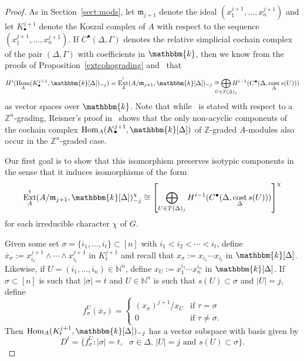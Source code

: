 \documentclass[10pt]{amsart}
\theoremstyle{definition}
\DeclareMathOperator\cost{cost}
\DeclareMathOperator{\Hom}{Hom}
\DeclareMathOperator{\Ext}{Ext}
\newcommand{\field}{\mathbbm{k}}
\newcommand{\NN}{{\mathbb N}}
\newcommand{\ZZ}{{\mathbb Z}}
\newcommand{\mideal}{\ensuremath{\mathfrak{m}}}
\begin{document}
\begin{proof}
As in Section~\ref{sect:mods}, let $\mideal_{j+1}$ denote the ideal $(x_1^{j+1}, \ldots, x_n^{j+1})$ and let $K_\bullet^{j+1}$ denote the Koszul complex of $A$ with respect to the sequence $(x_1^{j+1}, \ldots, x_n^{j+1})$. If $C^\bullet(\Delta, \Gamma)$ denotes the relative simplicial cochain complex of the pair $(\Delta, \Gamma)$ with coefficients in $\field$, then we know from the proofs of Proposition~\ref{extcohograding} and~\cite[Theorem~1]{characterizations} that
\begin{align}\label{ExtAndCochainComplex}
H^i(\Hom_A(K_\bullet^{j+1}, \field[\Delta])_{-j})=\Ext_{A}^i(A/\mideal_{j+1}, \field[\Delta])_{-j}\cong \bigoplus_{\mathclap{{U\in T(\Delta)_j}}}H^{i-1}(C^\bullet(\Delta, \cost_\Delta s(U)))
\end{align}
as vector spaces over $\field$. Note that while~\cite[Theorem~1]{characterizations} is stated with respect to a $\ZZ^n$-grading, Reisner's proof in~\cite[Theorem~2]{Reisner} shows that the only non-acyclic components of the cochain complex $\Hom_A(K_\bullet^{j+1}, \field[\Delta])$ of $\ZZ$-graded $A$-modules also occur in the $\ZZ^n$-graded case.

Our first goal is to show that this isomorphism preserves isotypic components in the sense that it induces isomorphisms of the form
\begin{equation}\label{extiso}
\Ext_{A}^i(A/\mideal_{j+1}, \field[\Delta])_{-j}^\chi\cong \left[\bigoplus_{U\in T(\Delta)_j}H^{i-1}(C^\bullet(\Delta, \cost_\Delta s(U)))\right]^{\chi}
\end{equation}
for each irreducible character $\chi$ of $G$.



Given some set $\sigma=\{i_1, \ldots, i_t\}\subset [n]$ with $i_1<i_2<\cdots<i_t$, define $\overline{x}_\sigma:=x_{i_1}^{j+1}\wedge\cdots\wedge x_{i_t}^{j+1}$ in $K_t^{j+1}$ and recall that $x_\sigma := x_{i_1}\cdots x_{i_t}$ in $\field[\Delta]$. Likewise, if $U=(i_1, \ldots, i_n)\in \NN^n$, define $x_U:=x_{1}^{i_1}\cdots x_{n}^{i_n}$ in $\field[\Delta]$. If $\sigma\subset [n]$ is such that $|\sigma|=t$ and $U\in \NN^n$ is such that $s(U)\subset \sigma$ and $|U|=j$, define
\[
f_{\sigma}^U(\overline{x}_\tau)=
\begin{cases}
(x_\sigma)^{j+1}/x_U & \text{if } \tau=\sigma\\
0 & \text{if }\tau\not=\sigma.
\end{cases}
\]
Then $\Hom_A(K_t^{j+1}, \field[\Delta])_{-j}$ has a vector subspace with basis given by
\[
D^t=\{f_{\sigma}^U: |\sigma|=t, \text{ $\sigma\in \Delta$, $|U|=j$ and }s(U)\subset \sigma \}.
\]


\end{proof}
\end{document}
